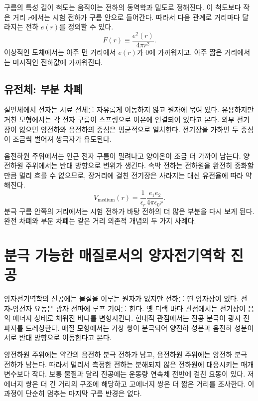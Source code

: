 구름의 특성 길이 척도는 움직이는 전하의 동역학과 밀도로 정해진다. 이 척도보다 작은 거리 \(r\)에서는 시험 전하가 구름 안으로 들어간다. 따라서 다음 관계로 거리마다 달라지는 전하 \(e(r)\)를 정의할 수 있다.
\begin{equation}
  F(r)\equiv\frac{e^2(r)}{4\pi r^2}.
  \label{eq:l10-running-charge-definition}
\end{equation}
이상적인 도체에서는 아주 먼 거리에서 \(e(r)\)가 0에 가까워지고, 아주 짧은 거리에서는 미시적인 전하값에 가까워진다.

\subsection{유전체: 부분 차폐}

절연체에서 전자는 시료 전체를 자유롭게 이동하지 않고 원자에 묶여 있다. 유용하지만 거친 모형에서는 각 전자 구름이 스프링으로 이온에 연결되어 있다고 본다. 외부 전기장이 없으면 양전하와 음전하의 중심은 평균적으로 일치한다. 전기장을 가하면 두 중심이 조금씩 벌어져 쌍극자가 유도된다.

음전하원 주위에서는 인근 전자 구름이 밀려나고 양이온이 조금 더 가까이 남는다. 양전하원 주위에서는 반대 방향으로 변위가 생긴다. 속박 전하는 전하원을 완전히 중화할 만큼 멀리 흐를 수 없으므로, 장거리에 걸친 전기장은 사라지는 대신 유전율에 따라 약해진다.
\begin{equation}
  V_{\mathrm{medium}}(r)
  =
  \frac{1}{\epsilon_r}
  \frac{e_1e_2}{4\pi\epsilon_0r}.
  \label{eq:l10-dielectric-coulomb}
\end{equation}
분극 구름 안쪽의 거리에서는 시험 전하가 바탕 전하의 더 많은 부분을 다시 보게 된다. 완전 차폐와 부분 차폐는 같은 거리 의존적 개념의 두 가지 사례다.

\section{분극 가능한 매질로서의 양자전기역학 진공}

양자전기역학의 진공에는 물질을 이루는 원자가 없지만 전하를 띤 양자장이 있다. 전자-양전자 요동은 광자 전파에 루프 기여를 한다. 옛 디랙 바다 관점에서는 전기장이 음의 에너지 상태로 채워진 바다를 변형시킨다. 현대적 관점에서는 진공 분극이 광자 전파자를 드레싱한다. 매질 모형에서는 가상 쌍이 분극되어 양전하 성분과 음전하 성분이 서로 반대 방향으로 이동한다고 본다.

양전하원 주위에는 약간의 음전하 분극 전하가 남고, 음전하원 주위에는 양전하 분극 전하가 남는다. 따라서 멀리서 측정한 전하는 분해되지 않은 전하원에 대응시키는 매개변수보다 작다. 보통 물질과 달리 진공에는 운동량 연속체 전반에 걸친 요동이 있다. 저에너지 쌍은 더 긴 거리의 구조에 해당하고 고에너지 쌍은 더 짧은 거리를 조사한다. 이 과정이 단순히 멈추는 마지막 구름 반경은 없다.

